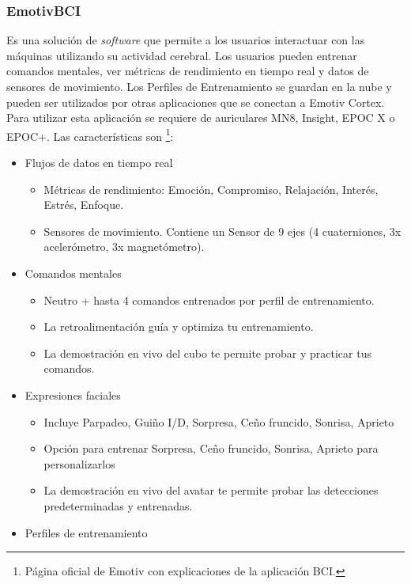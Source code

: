 \subsubsection{EmotivBCI}
Es una solución de \textit{software} que permite a los usuarios interactuar con las máquinas utilizando su actividad cerebral. Los usuarios pueden entrenar comandos mentales, ver métricas de rendimiento en tiempo real y datos de sensores de movimiento. Los Perfiles de Entrenamiento se guardan en la nube y pueden ser utilizados por otras aplicaciones que se conectan a Emotiv Cortex. Para utilizar esta aplicación se requiere de auriculares MN8, Insight, EPOC X o EPOC+. Las características son \cite{emotivBci}\footnote{Página oficial de Emotiv con explicaciones de la aplicación BCI\cite{emotivBci}.}:
    
\begin{itemize}
    \item Flujos de datos en tiempo real
    \begin{itemize}
        \item Métricas de rendimiento: Emoción, Compromiso, Relajación, Interés, Estrés, Enfoque.
        \item Sensores de movimiento. Contiene un Sensor de 9 ejes (4 cuaterniones, 3x acelerómetro, 3x magnetómetro).
    \end{itemize}
    \item Comandos mentales
    \begin{itemize}
        \item Neutro + hasta 4 comandos entrenados por perfil de entrenamiento.
        \item La retroalimentación guía y optimiza tu entrenamiento.
        \item La demostración en vivo del cubo te permite probar y practicar tus comandos.
    \end{itemize}
    \item Expresiones faciales
    \begin{itemize}
        \item Incluye Parpadeo, Guiño I/D, Sorpresa, Ceño fruncido, Sonrisa, Aprieto
        \item Opción para entrenar Sorpresa, Ceño fruncido, Sonrisa, Aprieto para personalizarlos
        \item La demostración en vivo del avatar te permite probar las detecciones predeterminadas y entrenadas.
    \end{itemize}
    \item Perfiles de entrenamiento

\end{itemize}

